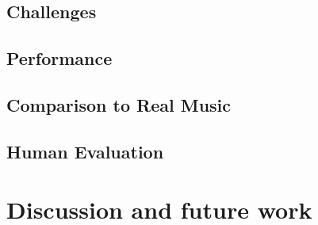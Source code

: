 \documentclass[12pt]{article}
\begin{document}
\subsection{Challenges}
\subsection{Performance}
\subsection{Comparison to Real Music}
\subsection{Human Evaluation}

\section{Discussion and future work}
\end{document}
